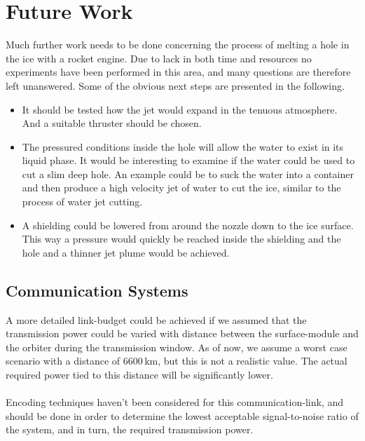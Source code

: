 \chapter{Future Work}


Much further work needs to be done concerning the process of melting a hole in the ice with a rocket engine. Due to lack in both time and resources no experiments have been performed in this area, and many questions are therefore left unanswered. Some of the obvious next steps are presented in the following.
\begin{itemize}
\item It should be tested how the jet would expand in the tenuous atmosphere. And a suitable thruster should be chosen.

\item The pressured conditions inside the hole will allow the water to exist in its liquid phase. It would be interesting to examine if the water could be used to cut a slim deep hole. An example could be to suck the water into a container and then produce a high velocity jet of water to cut the ice, similar to the process of water jet cutting.

\item A shielding could be lowered from around the nozzle down to the ice surface. This way a pressure would quickly be reached inside the shielding and the hole and a thinner jet plume would be achieved.
\end{itemize}

\section{Communication Systems}


A more detailed link-budget could be achieved if we assumed that the transmission power could be varied with distance between the surface-module and the orbiter during the transmission window. As of now, we assume a worst case scenario with a distance of $6600\,\mathrm{km}$, but this is not a realistic value. The actual required power tied to this distance will be significantly lower.\\
\\
Encoding techniques haven't been considered for this communication-link, and should be done in order to determine the lowest acceptable signal-to-noise ratio of the system, and in turn, the required transmission power.  

